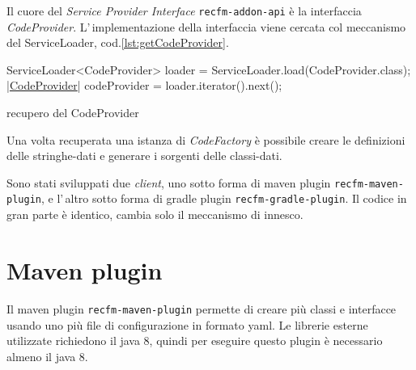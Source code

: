 \documentclass[a4paper,10pt]{report}
\newif\ifesource
\newenvironment{elisting}[1][!htb]
  {\captionsetup{aboveskip=0pt}\begin{listing}[#1]}
  {\end{listing}%
}
\begin{document}
Il cuore del \textsl{Service Provider Interface} \verb!recfm-addon-api! è la
interfaccia \textsl{CodeProvider}. L'\,implementazione della interfaccia
viene cercata col meccanismo del ServiceLoader, cod.\ref{lst:getCodeProvider}.

\ifesource
\begin{figure*}[!htb]
\begin{lstlisting}[language=java, caption=recupero del CodeProvider, 
label=lst:getCodeProvider]
        ServiceLoader<CodeProvider> loader = ServiceLoader.load(CodeProvider.class);
        (*\hyperref[lst:CodeProvider]{CodeProvider}*) codeProvider = loader.iterator().next();
\end{lstlisting}
\end{figure*}
\else
\begin{elisting}
\begin{javacode}
        ServiceLoader<CodeProvider> loader = ServiceLoader.load(CodeProvider.class);
        |\hyperref[lst:CodeProvider]{CodeProvider}| codeProvider = loader.iterator().next();
\end{javacode}
\caption{recupero del CodeProvider}
\label{lst:getCodeProvider}
\end{elisting}
\fi

Una volta recuperata una istanza di \textsl{CodeFactory} è possibile creare le
definizioni delle stringhe-dati e generare i sorgenti delle classi-dati.

Sono stati sviluppati due \textsl{client}, uno sotto forma di maven plugin 
\verb!recfm-maven-plugin!, e l'\,altro sotto forma di gradle plugin 
\verb!recfm-gradle-plugin!. Il codice in gran parte è identico, cambia solo il 
meccanismo di innesco.

\section{Maven plugin}
Il maven plugin \verb!recfm-maven-plugin! permette di creare più classi e 
interfacce usando uno più file di configurazione in formato yaml.
Le librerie esterne utilizzate richiedono il java 8, quindi per eseguire questo 
plugin è necessario almeno il java 8.
\end{document}
